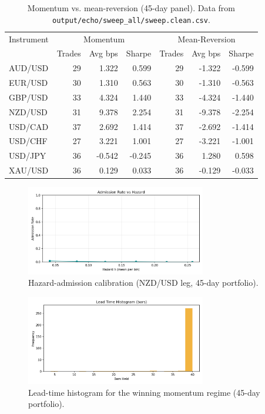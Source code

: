 \documentclass[11pt]{article}
\begin{document}
\begin{table}[h]
  \centering
  \caption{Momentum vs. mean-reversion (45-day panel). Data from \texttt{output/echo/sweep\_all/sweep.clean.csv}.}
  \label{tab:mrcontrol}
  \begin{tabular}{lrrrrrr}
    \toprule
    Instrument & \multicolumn{3}{c}{Momentum} & \multicolumn{3}{c}{Mean-Reversion} \\
    \cmidrule(lr){2-4} \cmidrule(lr){5-7}
     & Trades & Avg bps & Sharpe & Trades & Avg bps & Sharpe \\
    \midrule
    AUD/USD & 29 & 1.322 & 0.599 & 29 & -1.322 & -0.599 \\
    EUR/USD & 30 & 1.310 & 0.563 & 30 & -1.310 & -0.563 \\
    GBP/USD & 33 & 4.324 & 1.440 & 33 & -4.324 & -1.440 \\
    NZD/USD & 31 & 9.378 & 2.254 & 31 & -9.378 & -2.254 \\
    USD/CAD & 37 & 2.692 & 1.414 & 37 & -2.692 & -1.414 \\
    USD/CHF & 27 & 3.221 & 1.001 & 27 & -3.221 & -1.001 \\
    USD/JPY & 36 & -0.542 & -0.245 & 36 & 1.280 & 0.598 \\
    XAU/USD & 36 & 0.129 & 0.033 & 36 & -0.129 & -0.033 \\
    \bottomrule
  \end{tabular}
\end{table}

\begin{figure}[t]
  \centering
  \includegraphics[width=0.7\textwidth]{figures/rg_hazard_calibration.png}
  \caption{Hazard-admission calibration (NZD/USD leg, 45-day portfolio).}
  \label{fig:hazard-calibration}
\end{figure}

\begin{figure}[t]
  \centering
  \includegraphics[width=0.7\textwidth]{figures/rg_lead_time_hist.png}
  \caption{Lead-time histogram for the winning momentum regime (45-day portfolio).}
  \label{fig:leadtime}
\end{figure}
\end{document}
